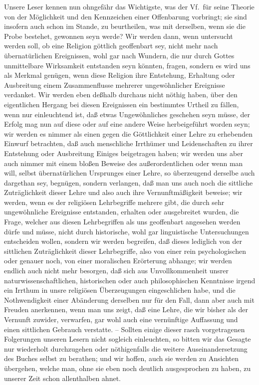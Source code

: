 Unsere Leser kennen nun ohngefähr das Wichtigste, was der Vf.\ für seine Theorie von der Möglichkeit und den Kennzeichen einer Offenbarung vorbringt; sie sind insofern auch schon im Stande, zu beurtheilen, was mit derselben, wenn sie die Probe bestehet, gewonnen seyn werde? Wir werden dann, wenn untersucht werden soll, ob eine Religion göttlich geoffenbart sey, nicht mehr nach übernatürlichen Ereignissen, wohl gar nach Wundern, die nur durch Gottes unmittelbare Wirksamkeit entstanden seyn könnten, fragen, sondern es wird uns als  Merkmal genügen, wenn diese Religion ihre Entstehung, Erhaltung oder Ausbreitung einem Zusammenflusse mehrerer ungewöhnlicher Ereignisse verdanket. Wir werden eben deßhalb durchaus nicht nöthig haben, über den eigentlichen Hergang bei diesen Ereignissen ein bestimmtes Urtheil zu fällen, wenn nur einleuchtend ist, daß etwas Ungewöhnliches geschehen seyn müsse, der Erfolg mag nun auf diese oder auf eine andere Weise herbeigeführt worden seyn; wir werden es nimmer als einen gegen die Göttlichkeit einer Lehre zu erhebenden Einwurf betrachten, daß auch menschliche Irrthümer und Leidenschaften zu ihrer Entstehung oder Ausbreitung Einiges beigetragen haben; wir werden uns aber auch nimmer mit einem bloßen Beweise des außerordentlichen oder wenn man will, selbst übernatürlichen Ursprunges einer Lehre, so überzeugend derselbe auch dargethan sey, begnügen, sondern verlangen, daß man uns auch noch die sittliche Zuträglichkeit dieser Lehre und also auch ihre Vernunftmäßigkeit beweise; wir werden, wenn es der religiösen Lehrbegriffe mehrere gibt, die durch sehr ungewöhnliche Ereignisse entstanden, erhalten oder ausgebreitet wurden, die Frage, welcher aus diesen Lehrbegriffen als uns geoffenbart angesehen werden dürfe und müsse, nicht durch historische, wohl gar linguistische Untersuchungen entscheiden wollen, sondern wir werden begreifen, daß dieses lediglich von der sittlichen Zuträglichkeit dieser Lehrbegriffe, also von einer  rein psychologischen oder genauer noch, von einer moralischen Erörterung abhange; wir werden endlich auch nicht mehr besorgen, daß sich aus Unvollkommenheit unsrer naturwissenschaftlichen, historischen oder auch philosophischen Kenntnisse irgend ein Irrthum in unsre religiösen Überzeugungen eingeschlichen habe, und die Nothwendigkeit einer Abänderung derselben nur für den Fall, dann aber auch mit Freuden anerkennen, wenn man uns zeigt, daß eine Lehre, die wir bisher als der Vernunft zuwider, verwarfen, gar wohl auch eine vernünftige Auffassung und einen sittlichen Gebrauch verstatte. -- Sollten einige dieser rasch vorgetragenen Folgerungen unseren Lesern nicht sogleich einleuchten, so bitten wir das Gesagte nur wiederholt durchzugehen oder nöthigenfalls die weitere Auseinandersetzung des Buches selbst zu berathen; und wir hoffen, auch sie werden zu Ansichten übergehen, welche man, ohne sie eben noch deutlich ausgesprochen zu haben, zu unserer Zeit schon allenthalben ahnet. \par
